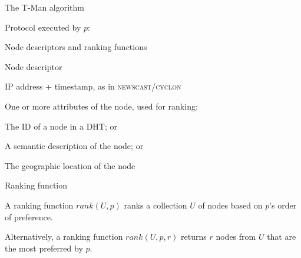 \begin{frame}[shrink]{The T-Man algorithm}
	
\begin{Procedure}
\caption{Protocol executed by $p$:}

\BlankLine
{}
\BlankLine
{}
\BlankLine
{}
\end{Procedure}

\end{frame}

\begin{frame}{Node descriptors and ranking functions}
	
\begin{block}{Node descriptor}
\BI
\item IP address + timestamp, as in \textsc{newscast}/\textsc{cyclon}
\item One or more attributes of the node, used for ranking:
	\BI
	\item The ID of a node in a DHT; or
	\item A semantic description of the node; or
	\item The geographic location of the node
	\EI
\EI
\end{block}

\begin{block}{Ranking function}
\BI
\item A \alert{ranking function} $\mathit{rank}(U,p)$ ranks a collection $U$ of nodes based
on $p$'s order of preference.
\item Alternatively, a \alert{ranking function} $\mathit{rank}(U,p,r)$ returns $r$ nodes from
$U$ that are the most preferred by $p$.
\EI
\end{block}

\end{frame}

